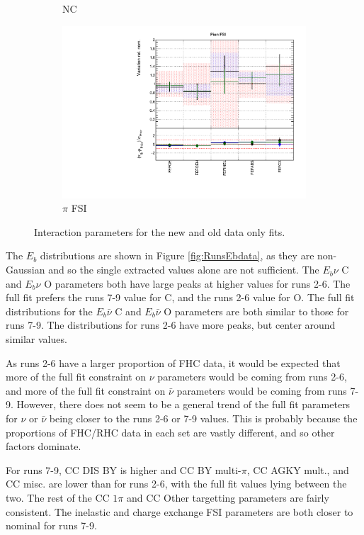 \begin{figure}
\begin{subfigure}{0.49\textwidth}
  \caption{NC}
\end{subfigure}
\begin{subfigure}{0.49\textwidth}
  \centering
  \includegraphics[width=0.9\linewidth]{figs/newolddatafitsxsec_5}
  \caption{$\pi$ FSI}
\end{subfigure}
\caption{Interaction parameters for the new and old data only fits.}
\label{fig:newolddataxsec}
\end{figure}

The $E_b$ distributions are shown in Figure \ref{fig:RunsEbdata}, as they are non-Gaussian and so the single extracted values alone are not sufficient. The $E_b \nu$ C and $E_b \nu$ O parameters both have large peaks at higher values for runs 2-6. The full fit prefers the runs 7-9 value for C, and the runs 2-6 value for O. The full fit distributions for the $E_b \bar{\nu}$ C and $E_b \bar{\nu}$ O parameters are both similar to those for runs 7-9. The distributions for runs 2-6 have more peaks, but center around similar values.

As runs 2-6 have a larger proportion of FHC data, it would be expected that more of the full fit constraint on $\nu$ parameters would be coming from runs 2-6, and more of the full fit constraint on $\bar{\nu}$ parameters would be coming from runs 7-9. However, there does not seem to be a general trend of the full fit parameters for $\nu$ or $\bar{\nu}$ being closer to the runs 2-6 or 7-9 values. This is probably because the proportions of FHC/RHC data in each set are vastly different, and so other factors dominate.

For runs 7-9, CC DIS BY is higher and CC BY multi-$\pi$, CC AGKY mult., and CC misc. are lower than for runs 2-6, with the full fit values lying between the two. The rest of the CC $1\pi$ and CC Other targetting parameters are fairly consistent. The inelastic and charge exchange FSI parameters are both closer to nominal for runs 7-9.

